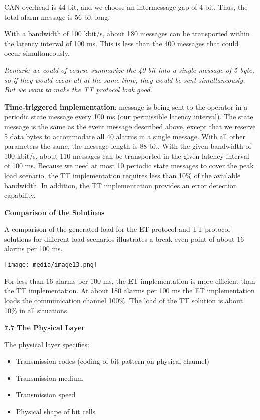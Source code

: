 CAN overhead is 44 bit, and we choose an intermessage gap of 4 bit.
Thus, the total alarm message is 56 bit long.

With a bandwidth of 100 kbit/s, about 180 messages can be transported
within the latency interval of 100 ms. This is less than the 400
messages that could occur simultaneously.

\emph{Remark: we could of course summarize the 40 bit into a single
message of 5 byte, so if they would occur all at the same time, they
would be sent simultaneously. But we want to make the TT protocol look
good.}

\textbf{Time-triggered implementation}: message is being sent to the
operator in a periodic state message every 100 ms (our permissible
latency interval). The state message is the same as the event message
described above, except that we reserve 5 data bytes to accommodate all
40 alarms in a single message. With all other parameters the same, the
message length is 88 bit. With the given bandwidth of 100 kbit/s, about
110 messages can be transported in the given latency interval of 100 ms.
Because we need at most 10 periodic state messages to cover the peak
load scenario, the TT implementation requires less than 10\% of the
available bandwidth. In addition, the TT implementation provides an
error detection capability.

\textbf{Comparison of the Solutions}

A comparison of the generated load for the ET protocol and TT protocol
solutions for different load scenarios illustrates a break-even point of
about 16 alarms per 100 ms.

\texttt{[image: media/image13.png]}

For less than 16 alarms per 100 ms, the ET implementation is more
efficient than the TT implementation. At about 180 alarms per 100 ms the
ET implementation loads the communication channel 100\%. The load of the
TT solution is about 10\% in all situations.

\textbf{7.7} \protect\hypertarget{teil8}{}{}\textbf{The Physical Layer}

The physical layer specifies:

\begin{itemize}
\item
  Transmission codes (coding of bit pattern on physical channel)
\item
  Transmission medium
\item
  Transmission speed
\item
  Physical shape of bit cells
\end{itemize}

